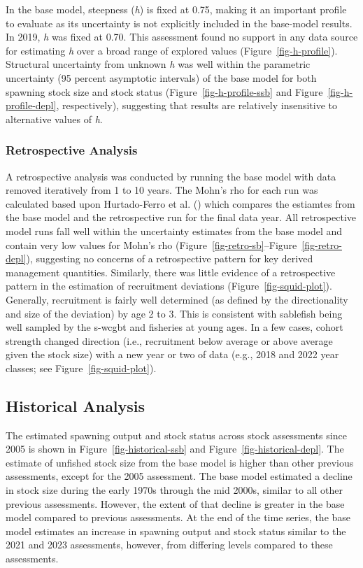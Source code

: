 \documentclass[
  english,
]{article}
\begin{document}
In the base model, steepness (\emph{h}) is fixed at 0.75, making it an
important profile to evaluate as its uncertainty is not explicitly
included in the base-model results. In 2019, \emph{h} was fixed at 0.70.
This assessment found no support in any data source for estimating
\emph{h} over a broad range of explored values
(Figure~\ref{fig-h-profile}). Structural uncertainty from unknown
\emph{h} was well within the parametric uncertainty (95 percent
asymptotic intervals) of the base model for both spawning stock size and
stock status (Figure~\ref{fig-h-profile-ssb} and
Figure~\ref{fig-h-profile-depl}, respectively), suggesting that results
are relatively insensitive to alternative values of \emph{h}.

\subsubsection{Retrospective Analysis}\label{retro}

A retrospective analysis was conducted by running the base model with
data removed iteratively from 1 to 10 years. The Mohn's rho for each run
was calculated based upon Hurtado-Ferro et al.
() which compares the
estiamtes from the base model and the retrospective run for the final
data year. All retrospective model runs fall well within the uncertainty
estimates from the base model and contain very low values for Mohn's rho
(Figure~\ref{fig-retro-sb}--Figure~\ref{fig-retro-depl}), suggesting no
concerns of a retrospective pattern for key derived management
quantities. Similarly, there was little evidence of a retrospective
pattern in the estimation of recruitment deviations
(Figure~\ref{fig-squid-plot}). Generally, recruitment is fairly well
determined (as defined by the directionality and size of the deviation)
by age 2 to 3. This is consistent with sablefish being well sampled by
the \gls{s-wcgbt} and fisheries at young ages. In a few cases, cohort
strength changed direction (i.e., recruitment below average or above
average given the stock size) with a new year or two of data (e.g., 2018
and 2022 year classes; see Figure~\ref{fig-squid-plot}).

\subsection{Historical Analysis}\label{historical}

The estimated spawning output and stock status across stock assessments
since 2005 is shown in Figure~\ref{fig-historical-ssb} and
Figure~\ref{fig-historical-depl}. The estimate of unfished stock size
from the base model is higher than other previous assessments, except
for the 2005 assessment. The base model estimated a decline in stock
size during the early 1970s through the mid 2000s, similar to all other
previous assessments. However, the extent of that decline is greater in
the base model compared to previous assessments. At the end of the time
series, the base model estimates an increase in spawning output and
stock status similar to the 2021 and 2023 assessments, however, from
differing levels compared to these assessments.
\end{document}
